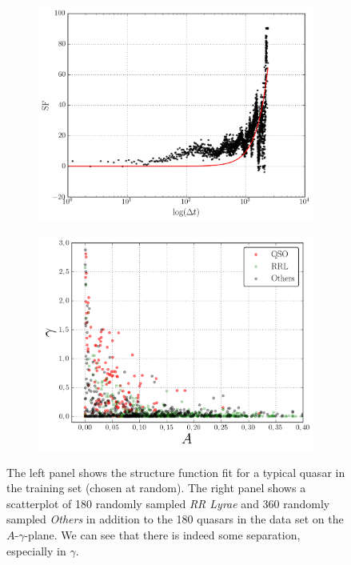\begin{figure}[h]
	\centering
	\begin{subfigure}[t]{0.49\textwidth}
		\centering
		\label{fig:2e}
		\includegraphics[width=\textwidth]{figures/sf/sf-fit.png}
	\end{subfigure}
	\begin{subfigure}[t]{0.49\textwidth}
		\centering
		\label{fig:2f}
		\includegraphics[width=\textwidth]{figures/sf/sf-scatterplot.png}
	\end{subfigure}
	\caption[Visualization of the structure function features]{The left panel shows the structure function fit for a typical quasar in the training set (chosen at random). The right panel shows a scatterplot of 180 randomly sampled \emph{RR Lyrae} and 360 randomly sampled \emph{Others} in addition to the 180 quasars in the data set on the $A$-$\gamma$-plane. We can see that there is indeed some separation, especially in $\gamma$.}
	\label{fig:features-structure-function}
\end{figure}

